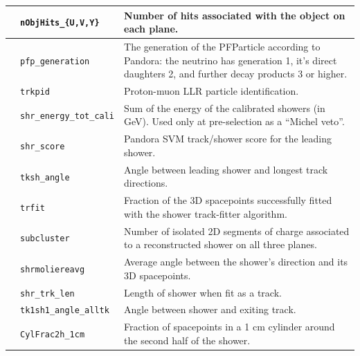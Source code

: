 \begin{table}[ht]
\begin{tabular}{ m{} | m{} | m{}  }
\multicolumn{1}{l|}{} & \texttt{nObjHits\_\{U,V,Y\}} & Number of hits associated with the object on each plane.\\  
\hline
\parbox[t]{2mm}{}  &
 \texttt{pfp\_generation} & The generation of the PFParticle according to Pandora: the neutrino has generation 1, it's direct daughters 2, and further decay products 3 or higher.\\  
 & \texttt{trkpid}  &  Proton-muon LLR particle identification. \\  
 & \texttt{shr\_energy\_tot\_cali}  & Sum  of  the  energy  of  the  calibrated  showers  (in  GeV). Used  only  at pre-selection as a ``Michel veto”.\\  
 & \texttt{shr\_score} & Pandora  SVM track/shower score for the leading shower.\\  
 & \texttt{tksh\_angle}  & Angle  between  leading  shower   and  longest  track directions.\\  
 & \texttt{trfit} & Fraction of the 3D spacepoints successfully fitted with the shower track-fitter algorithm. \\  
 & \texttt{subcluster} & Number of isolated 2D segments of charge associated to a reconstructed shower on all three planes.  \\  
 & \texttt{shrmoliereavg} &  Average angle between the shower’s direction and its 3D spacepoints.    \\ 
 & \texttt{shr\_trk\_len} &  Length of shower when fit as a track.    \\ 
 & \texttt{tk1sh1\_angle\_alltk} &  Angle between shower and exiting track.    \\ 
 & \texttt{CylFrac2h\_1cm} & Fraction of spacepoints in a 1 cm cylinder around the second half of the shower.   \\ 

\end{tabular}
\end{table}
